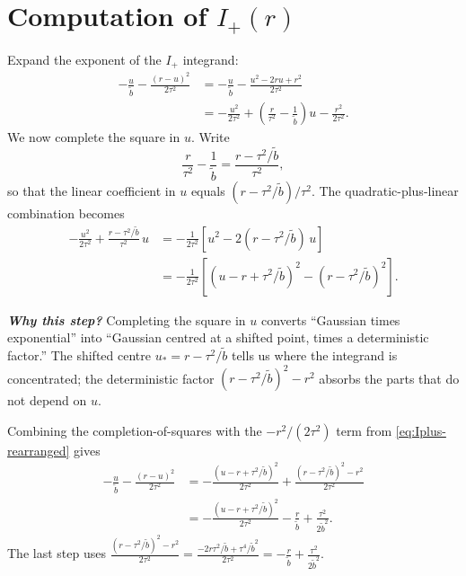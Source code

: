 \documentclass[11pt,a4paper,openany]{book}
\theoremstyle{plainserif}
\theoremstyle{definition}
\theoremstyle{remarkstyle}
\newenvironment{whybox}{%
  \begin{center}\begin{minipage}{0.95\linewidth}\small
  \textbf{\textit{Why this step?}}\quad\ignorespaces}{%
  \end{minipage}\end{center}}
\newcommand{\btilde}{\tilde{b}}
\begin{document}
\section{Computation of $I_+(r)$}
\label{sec:I-plus}

Expand the exponent of the $I_+$ integrand:
\begin{align}
-\frac{u}{\btilde} - \frac{(r-u)^2}{2\tau^2}
&= -\frac{u}{\btilde} - \frac{u^2 - 2ru + r^2}{2\tau^2}
\label{eq:Iplus-expand}\\
&= -\frac{u^2}{2\tau^2} + \left(\frac{r}{\tau^2} - \frac{1}{\btilde}\right) u
   - \frac{r^2}{2\tau^2}.
\label{eq:Iplus-rearranged}
\end{align}
We now complete the square in $u$. Write
\begin{equation}
\frac{r}{\tau^2} - \frac{1}{\btilde} = \frac{r - \tau^2/\btilde}{\tau^2},
\end{equation}
so that the linear coefficient in $u$ equals $(r - \tau^2/\btilde)/\tau^2$.
The quadratic-plus-linear combination becomes
\begin{align}
-\frac{u^2}{2\tau^2} + \frac{r-\tau^2/\btilde}{\tau^2}\, u
&= -\frac{1}{2\tau^2}\left[ u^2 - 2(r - \tau^2/\btilde)\, u \right]
\label{eq:Iplus-sq-1}\\
&= -\frac{1}{2\tau^2}\left[ (u - r + \tau^2/\btilde)^2 - (r - \tau^2/\btilde)^2 \right].
\label{eq:Iplus-sq-2}
\end{align}

\begin{whybox}
Completing the square in $u$ converts ``Gaussian times exponential'' into
``Gaussian centred at a shifted point, times a deterministic factor.''
The shifted centre $u_* = r - \tau^2/\btilde$ tells us where the
integrand is concentrated; the deterministic factor $(r-\tau^2/\btilde)^2 - r^2$
absorbs the parts that do not depend on $u$.
\end{whybox}

Combining the completion-of-squares with the $-r^2/(2\tau^2)$ term from
\eqref{eq:Iplus-rearranged} gives
\begin{align}
-\frac{u}{\btilde} - \frac{(r-u)^2}{2\tau^2}
 &= -\frac{(u - r + \tau^2/\btilde)^2}{2\tau^2}
   + \frac{(r-\tau^2/\btilde)^2 - r^2}{2\tau^2}
\label{eq:Iplus-almost}\\
 &= -\frac{(u - r + \tau^2/\btilde)^2}{2\tau^2}
   - \frac{r}{\btilde} + \frac{\tau^2}{2\btilde^2}.
\label{eq:Iplus-final-exponent}
\end{align}
The last step uses
$\frac{(r-\tau^2/\btilde)^2 - r^2}{2\tau^2}
= \frac{-2r\tau^2/\btilde + \tau^4/\btilde^2}{2\tau^2}
= -\frac{r}{\btilde} + \frac{\tau^2}{2\btilde^2}$.
\end{document}
